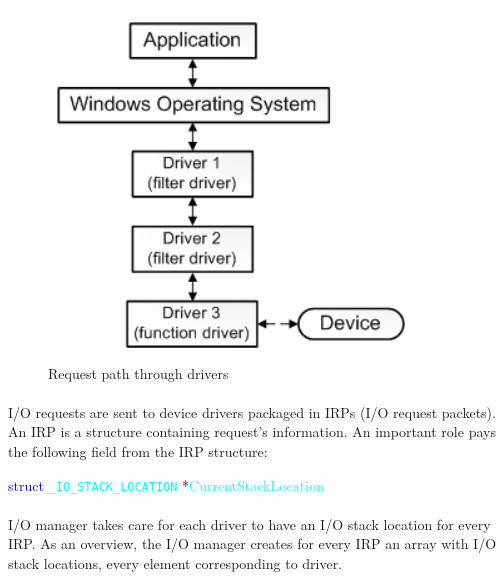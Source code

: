 		
		\begin{figure}[h!]
			\begin{center}
				\includegraphics{images/Drivers.jpg}
				\caption{Request path through drivers\cite{MSDNWhatIsADriver}}
				\label{fig:drivers}
			\end{center}
		\end{figure}
		\paragraph{}
		I/O requests are sent to device drivers packaged in IRPs (I/O request packets). An IRP is a structure containing request's information. An important role pays the following field from the IRP structure: \cite{MSDNIORequests}
		\bigskip
		
			\centerline{\textcolor{blue}{struct} \textcolor{cyan}{\texttt{\_IO\_STACK\_LOCATION}} *\textcolor{cyan}{CurrentStackLocation}}
		
		\bigskip
		\paragraph{}
		I/O manager takes care for each driver to have an I/O stack location for every IRP. As an overview, the I/O manager creates for every IRP an array with I/O stack locations, every element corresponding to driver.
		
